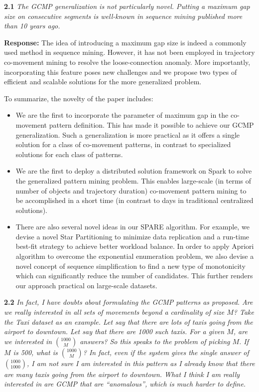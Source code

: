 \documentclass{vldb}
\begin{document}
\textbf{2.1} \emph{The GCMP generalization is not particularly novel. Putting a maximum gap size
on consecutive segments is well-known
in sequence mining published more than
10 years ago.}

\textbf{Response:} The idea of introducing a maximum gap size is indeed a commonly used method in sequence mining. However, 
it has not been employed in trajectory co-movement mining to resolve the loose-connection anomaly. More importantly, incorporating
this feature poses new challenges and we propose two types of efficient and scalable solutions for the more generalized problem.

To summarize, the novelty of the paper includes:
\begin{itemize}
\item We are the first to incorporate the parameter of maximum gap in the co-movement pattern definition. This has made
it possible to achieve our GCMP generalization. Such a generalization is more practical as it offers a single solution  
for a class of co-movement patterns, in contrast to specialized solutions for each class of patterns.

\item We are the first to deploy a distributed solution framework on Spark to solve the generalized pattern mining problem.
This enables large-scale (in terms of number of objects and trajectory duration) co-movement pattern mining to be accomplished
in a short time (in contrast to days in traditional centralized solutions).

\item There are also several novel ideas in our SPARE algorithm. For example, we devise a novel Star Partitioning to minimize data replication and a run-time best-fit strategy to achieve better workload balance. 
In order to apply Apriori algorithm to overcome the exponential enumeration problem, we also devise a  novel concept of sequence simplification to find a new type of monotonicity which can significantly reduce the number of candidates. This further renders our approach practical on large-scale datasets.
\end{itemize}


\textbf{2.2} \emph{In fact, I have doubts about formulating the GCMP patterns as proposed. Are
we really interested in all sets of movements beyond a cardinality of size $M$? 
Take the Taxi dataset as an example. Let say that there are lots of taxis going
from the airport to downtown. Let say that there are 1000 such taxis. For a
given $M$, are we interested in ${1000 \choose M}$ answers? 
So this speaks to the problem of picking $M$. If $M$ is 500, what is ${1000 \choose M}$? In fact, even if the
system gives the single answer of ${1000\choose 1000}$,
I am not sure I am
interested in this pattern as I already know that there are many taxis going from
the airport to downtown. What I think I am really interested in are GCMP that
are ``anomalous'', which is much harder to define.}
\end{document}
